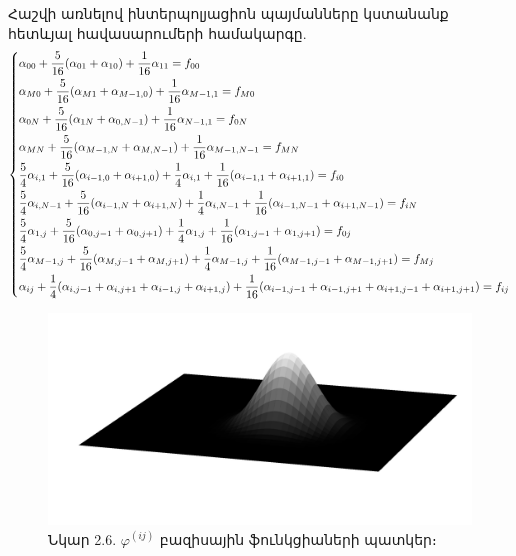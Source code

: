 \documentclass[fleqn, bachelor,subf,12pt,notitlepage]{article}
\begin{document}
Հաշվի առնելով ինտերպոլյացիոն պայմանները կստանանք հետևյալ հավասարումերի համակարգը.
\begin{equation}
\begin{dcases}
\alpha_{00}+\frac{5}{16}(\alpha_{01} + \alpha_{10}) +\frac{1}{16}\alpha_{11} = f_{00}\\
\alpha_{M0}+\frac{5}{16}(\alpha_{M1} + \alpha_{M-1,0}) +\frac{1}{16}\alpha_{M-1, 1} = f_{M0}\\
\alpha_{0N}+\frac{5}{16}(\alpha_{1N} + \alpha_{0,N-1}) +\frac{1}{16}\alpha_{N-1, 1} = f_{0N}\\
\alpha_{MN}+\frac{5}{16}(\alpha_{M-1,N} + \alpha_{M,N-1}) +\frac{1}{16}\alpha_{M-1,N-1} = f_{MN}\\
\frac{5}{4}\alpha_{i,1}+\frac{5}{16}(\alpha_{i-1,0} + \alpha_{i+1,0}) +\frac{1}{4}\alpha_{i,1} + \frac{1}{16}(\alpha_{i-1,1}+\alpha_{i+1,1}) = f_{i0}\\
\frac{5}{4}\alpha_{i,N-1}+\frac{5}{16}(\alpha_{i-1,N} + \alpha_{i+1,N}) +\frac{1}{4}\alpha_{i,N-1} + \frac{1}{16}(\alpha_{i-1,N-1}+\alpha_{i+1,N-1}) = f_{iN}\\
\frac{5}{4}\alpha_{1,j}+\frac{5}{16}(\alpha_{0,j-1} + \alpha_{0,j+1}) +\frac{1}{4}\alpha_{1,j} + \frac{1}{16}(\alpha_{1,j-1}+\alpha_{1,j+1}) = f_{0j}\\
\frac{5}{4}\alpha_{M-1,j}+\frac{5}{16}(\alpha_{M,j-1} + \alpha_{M,j+1}) +\frac{1}{4}\alpha_{M-1,j} + \frac{1}{16}(\alpha_{M-1,j-1}+\alpha_{M-1,j+1}) = f_{Mj}\\
\alpha_{ij} + \frac{1}{4}(\alpha_{i,j-1} + \alpha_{i,j+1} + \alpha_{i-1,j} + \alpha_{i+1,j}) + \frac{1}{16}(\alpha_{i-1,j-1} + \alpha_{i-1,j+1} + \alpha_{i+1,j-1} +\alpha_{i+1,j+1}) = f_{ij}
\end{dcases}
\end{equation}
\newpage
\begin{figure}[h!]
\centering
\includegraphics[width=1.0\textwidth]{images/two_dimensional_basis}
\captionsetup{labelformat=empty}
\caption{Նկար 2.6. $\varphi^{(ij)}$ բազիսային ֆունկցիաների պատկեր։}
\end{figure}
\end{document}
